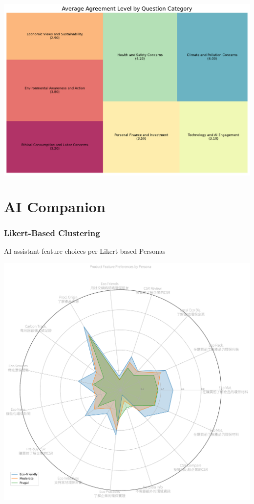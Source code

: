 \documentclass[
  letterpaper,
  DIV=11,
  numbers=noendperiod]{scrartcl}
\begin{document}
\includegraphics{_thesis_files/figure-pdf/cell-89-output-1.pdf}

\newpage

\section{AI Companion}\label{ai-companion}

\subsubsection{Likert-Based Clustering}\label{likert-based-clustering}

AI-assistant feature choices per Likert-based Personas

\includegraphics{_thesis_files/figure-pdf/cell-91-output-1.pdf}
\end{document}
